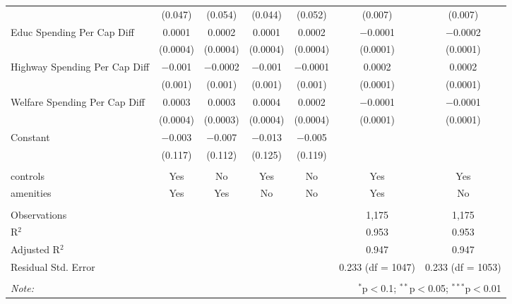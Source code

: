 \begin{table}[!htbp]
\begin{tabular}{@{\extracolsep{5pt}}lcccccc}
  & (0.047) & (0.054) & (0.044) & (0.052) & (0.007) & (0.007) \\ 
  Educ Spending Per Cap Diff & 0.0001 & 0.0002 & 0.0001 & 0.0002 & $-$0.0001 & $-$0.0002 \\ 
  & (0.0004) & (0.0004) & (0.0004) & (0.0004) & (0.0001) & (0.0001) \\ 
  Highway Spending Per Cap Diff & $-$0.001 & $-$0.0002 & $-$0.001 & $-$0.0001 & 0.0002 & 0.0002 \\ 
  & (0.001) & (0.001) & (0.001) & (0.001) & (0.0001) & (0.0001) \\ 
  Welfare Spending Per Cap Diff & 0.0003 & 0.0003 & 0.0004 & 0.0002 & $-$0.0001 & $-$0.0001 \\ 
  & (0.0004) & (0.0003) & (0.0004) & (0.0004) & (0.0001) & (0.0001) \\ 
  Constant & $-$0.003 & $-$0.007 & $-$0.013 & $-$0.005 &  &  \\ 
  & (0.117) & (0.112) & (0.125) & (0.119) &  &  \\ 
 \hline \\[-1.8ex] 
controls & Yes & No & Yes & No & Yes & Yes \\ 
amenities & Yes & Yes & No & No & Yes & No \\ 
\hline \\[-1.8ex] 
Observations &  &  &  &  & 1,175 & 1,175 \\ 
R$^{2}$ &  &  &  &  & 0.953 & 0.953 \\ 
Adjusted R$^{2}$ &  &  &  &  & 0.947 & 0.947 \\ 
Residual Std. Error &  &  &  &  & 0.233 (df = 1047) & 0.233 (df = 1053) \\ 
\hline 
\hline \\[-1.8ex] 
\textit{Note:}  & \multicolumn{6}{r}{$^{*}$p$<$0.1; $^{**}$p$<$0.05; $^{***}$p$<$0.01} \\ 
\end{tabular} 
\end{table} 

